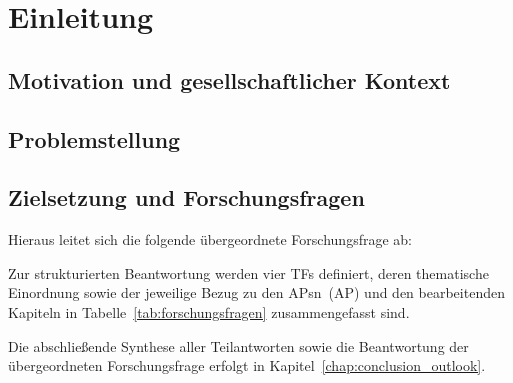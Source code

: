 \chapter{Einleitung}
\label{chap:introduction}


\section{Motivation und gesellschaftlicher Kontext}
\label{sec:motivation}

\lipsum[1-3]


\section{Problemstellung}
\label{sec:problem}

\lipsum[3-9]


\section{Zielsetzung und Forschungsfragen}
\label{sec:goal_research}
\lipsum[10]

Hieraus leitet sich die folgende übergeordnete Forschungsfrage ab:

\begin{quote}
    \textit{\lipsum[1][11]}
\end{quote}

Zur strukturierten Beantwortung werden vier \acp{TF} definiert, deren thematische Einordnung sowie der jeweilige Bezug zu den \aclp{AP}n~(\acs{AP}) und den bearbeitenden Kapiteln in Tabelle~\ref{tab:forschungsfragen} zusammengefasst sind.



Die abschließende Synthese aller Teilantworten sowie die Beantwortung der übergeordneten Forschungsfrage erfolgt in Kapitel~\ref{chap:conclusion_outlook}.


